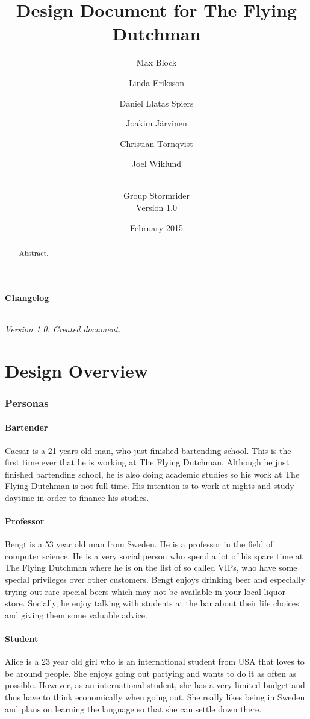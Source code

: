 \documentclass{article}
\title{Design Document for The Flying Dutchman}
\author{Max Block \and Linda Eriksson \and Daniel Llatas Spiers \and Joakim Järvinen \and Christian Törnqvist \and Joel Wiklund\and \\Group Stormrider\\Version 1.0}
\date{February 2015}
\begin{document}
\maketitle
\clearpage

\begin{abstract}
  Abstract.
\end{abstract}
\tableofcontents

\subsection*{Changelog}
\paragraph{}
\em{}Version 1.0:\em{} Created document.\\ 
\clearpage

\part{Design Overview}
\section{Personas}
\label{sec:label}
\subsection{Bartender}
Caesar is a 21 years old man, who just finished bartending school. This is the first time ever that he is working at The Flying Dutchman. Although he just finished bartending school, he is also doing academic studies so his work at The Flying Dutchman is not full time. His intention is to work at nights and study daytime in order to finance his studies.
\subsection{Professor}
Bengt is a 53 year old man from Sweden. He is a professor in the field of computer science. He is a very social person who spend a lot of his spare time at The Flying Dutchman where he is on the list of so called VIPs, who have some special privileges over other customers. Bengt enjoys drinking beer and especially trying out rare special beers which may not be available in your local liquor store. Socially, he enjoy talking with students at the bar about their life choices and giving them some valuable advice.
\subsection{Student}
Alice is a 23 year old girl who is an international student from USA that loves to be around people. She enjoys going out partying and wants to do it as often as possible. However, as an international student, she has a very limited budget and thus have to think economically when going out. She really likes being in Sweden and plans on learning the language so that she can settle down there.
\end{document}
